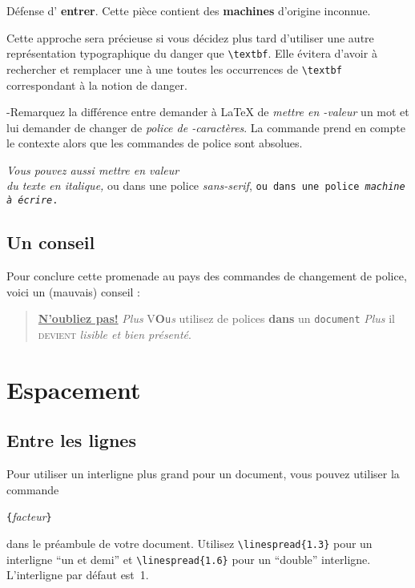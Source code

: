 \begin{example}
\newcommand{\danger}[1]{%
 \textbf{#1}}
Défense d'\danger{entrer}.
Cette pièce contient des
\danger{machines} d'origine
inconnue.
\end{example}

Cette approche sera précieuse si vous décidez plus tard
d'utiliser une autre représentation typographique du danger que
\verb|\textbf|. Elle évitera d'avoir à rechercher et remplacer une à
une toutes les occurrences de \verb|\textbf| correspondant à la notion
de danger.

-Remarquez la différence entre demander à \LaTeX{} de \emph{mettre en
-valeur} un mot et lui demander de changer de \emph{police de
-caractères}. La commande  prend en compte le contexte alors
que les commandes de police sont absolues.

\begin{example}
\textit{Vous pouvez aussi
  \emph{mettre en valeur}\\
  du texte en italique,}
\textsf{ou dans une police
  \emph{sans-serif},}
\texttt{ou dans une police
  \emph{machine à écrire}.}
\end{example}

\subsection{Un conseil}

Pour conclure cette promenade au pays des commandes de changement de
police, voici un (mauvais) conseil :
\begin{quote}
  \underline{\textbf{N'oubliez pas\Huge!}} \textit{Plus}
  \textsf{V\textbf{\LARGE O}\texttt{u}\textsl{s}} \Huge utilisez
  \tiny de polices \footnotesize \textbf{dans} un \small \texttt{document}
  \large \textit{Plus} \normalsize il \textsc{devient}
  \textsl{\textsf{lisible} et bien prés\large e\Large n\LARGE t\huge é}.
\end{quote}


\section{Espacement}

\subsection{Entre les lignes}

 Pour utiliser un interligne plus grand pour un
document, vous pouvez utiliser la commande
\begin{lscommand}
\verb|{|\emph{facteur}\verb|}|
\end{lscommand}
\noindent dans le préambule de votre document. Utilisez
\verb|\linespread{1.3}| pour un interligne \enquote{un et demi} et
\verb|\linespread{1.6}| pour un \enquote{double}
interligne. L'interligne par défaut est~1.

